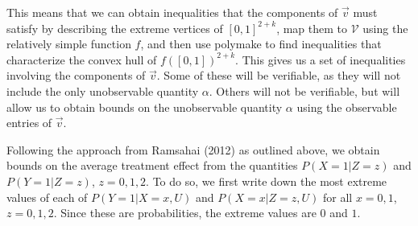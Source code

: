 \documentclass[
]{article}
\theoremstyle{plain}
\begin{document}
This means that we can obtain inequalities that the components of \(\vec{v}\) must satisfy by describing the extreme vertices of \([0,1]^{2+k}\), map them to \(\mathcal{V}\) using the relatively simple function \(f\), and then use polymake to find inequalities that characterize the convex hull of \(f([0,1])^{2+k}\). This gives us a set of inequalities involving the components of \(\vec{v}\). Some of these will be verifiable, as they will not include the only unobservable quantity \(\alpha\). Others will not be verifiable, but will allow us to obtain bounds on the unobservable quantity \(\alpha\) using the observable entries of \(\vec{v}\).

Following the approach from Ramsahai (2012) as outlined above, we obtain bounds on the average treatment effect from the quantities \(P(X = 1 | Z = z)\) and \(P(Y = 1 | Z = z)\), \(z = 0,1,2\). To do so, we first write down the most extreme values of each of \(P(Y = 1 | X = x, U)\) and \(P(X = x | Z = z, U)\) for all \(x=0,1\), \(z=0,1,2\). Since these are probabilities, the extreme values are \(0\) and \(1\).
\end{document}
